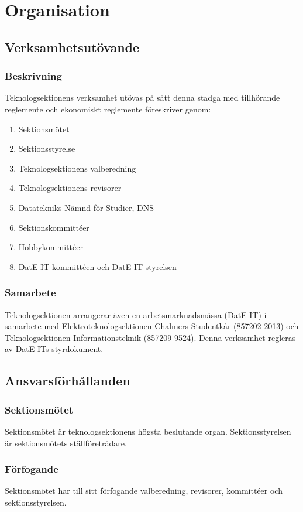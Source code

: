 \documentclass[a4paper]{dtek}
\begin{document}
\section{Organisation}
\subsection{Verksamhetsutövande}
\subsubsection{Beskrivning}
Teknologsektionens verksamhet utövas på sätt denna stadga med tillhörande reglemente och ekonomiskt reglemente föreskriver genom:
\begin{enumerate}
\item Sektionsmötet
\item Sektionsstyrelse
\item Teknologsektionens valberedning
\item Teknologsektionens revisorer
\item Datatekniks Nämnd för Studier, DNS
\item Sektionskommittéer
\item Hobbykommittéer
\item DatE-IT-kommittéen och DatE-IT-styrelsen
\end{enumerate}

\subsubsection{Samarbete}
Teknologsektionen arrangerar även en arbetsmarknadsmässa (DatE-IT) i samarbete med Elektroteknologsektionen Chalmers Studentkår (857202-2013) och Teknologsektionen Informationsteknik (857209-9524). Denna verksamhet regleras av DatE-ITs styrdokument. 
  
\subsection{Ansvarsförhållanden}
\subsubsection{Sektionsmötet}
Sektionsmötet är teknologsektionens högsta beslutande organ. Sektionsstyrelsen är sektionsmötets ställföreträdare.
\subsubsection{Förfogande}
Sektionsmötet har till sitt förfogande valberedning, revisorer, kommittéer och sektionsstyrelsen.
\newpage
\end{document}
